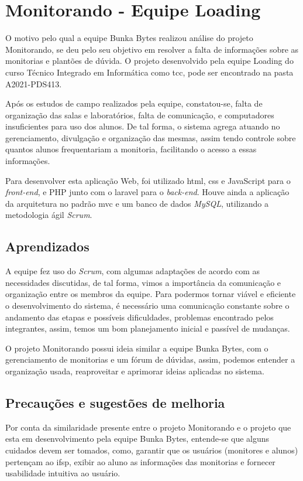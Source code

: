 \chapter[Monitorando]{Monitorando - Equipe Loading}
\label{monitorando}
O motivo pelo qual a equipe Bunka Bytes realizou análise do projeto Monitorando, se deu pelo seu objetivo em resolver a falta de informações sobre as monitorias e plantões de dúvida. O projeto desenvolvido pela equipe Loading do curso Técnico Integrado em Informática como \acs{tcc}, pode ser encontrado na pasta A2021-PDS413.

Após os estudos de campo realizados pela equipe, constatou-se, falta de organização das salas e laboratórios, falta de comunicação, e computadores insuficientes para uso dos alunos. De tal forma, o sistema agrega atuando no gerenciamento, divulgação e organização das mesmas, assim tendo controle sobre quantos alunos frequentariam a monitoria, facilitando o acesso a essas informações.

Para desenvolver esta aplicação Web, foi utilizado \acs{html}, \acs{css} e JavaScript para o \textsl{\gls{front-end}}, e PHP junto com o \gls{laravel} para o \textsl{\gls{back-end}}. Houve ainda a aplicação da arquitetura no padrão \acs{mvc} e um banco de dados \textsl{MySQL}, utilizando a metodologia ágil \textsl{Scrum}.

\section[Aprendizados]{Aprendizados}
A equipe fez uso do \textsl{Scrum}, com algumas adaptações de acordo com as necessidades discutidas, de tal forma, vimos a importância da comunicação e organização entre os membros da equipe. Para podermos tornar viável e eficiente o desenvolvimento do sistema, é necessário uma comunicação constante sobre o andamento das etapas e possíveis dificuldades, problemas encontrado pelos integrantes, assim, temos um bom planejamento inicial e passível de mudanças.

O projeto Monitorando possui ideia similar a equipe Bunka Bytes, com o gerenciamento de monitorias e um fórum de dúvidas, assim, podemos entender a organização usada, reaproveitar e aprimorar ideias aplicadas no sistema.

\section{Precauções e sugestões de melhoria}
Por conta da similaridade presente entre o projeto Monitorando e o projeto que esta em desenvolvimento pela equipe Bunka Bytes, entende-se que alguns cuidados devem ser tomados, como, garantir que os usuários (monitores e alunos) pertençam ao \acs{ifsp}, exibir ao aluno as informações das monitorias e fornecer usabilidade intuitiva ao usuário.

